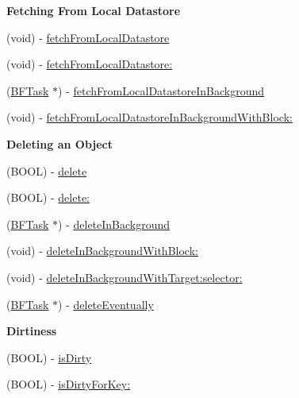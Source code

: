 \begin{Indent}{\bf Fetching From Local Datastore}\par
{\em 

 

 }\begin{DoxyCompactItemize}
\item 
(void) -\/ \hyperlink{interface_p_f_object_a93dbc7c60eb8bfcd239ad6b9c6df63ca}{fetch\+From\+Local\+Datastore}
\item 
(void) -\/ \hyperlink{interface_p_f_object_ae8707aa3350eaf3c39ab47ad1ec596ff}{fetch\+From\+Local\+Datastore\+:}
\item 
(\hyperlink{interface_b_f_task}{B\+F\+Task} $\ast$) -\/ \hyperlink{interface_p_f_object_a83205023ff184c314115a4c7cd500bfd}{fetch\+From\+Local\+Datastore\+In\+Background}
\item 
(void) -\/ \hyperlink{interface_p_f_object_af5cd865392d1feae3d079e8b0404d737}{fetch\+From\+Local\+Datastore\+In\+Background\+With\+Block\+:}
\end{DoxyCompactItemize}
\end{Indent}
\begin{Indent}{\bf Deleting an Object}\par
{\em 

 

 }\begin{DoxyCompactItemize}
\item 
(B\+O\+O\+L) -\/ \hyperlink{interface_p_f_object_ae661ddf471abc990874c0b1c36c6373c}{delete}
\item 
(B\+O\+O\+L) -\/ \hyperlink{interface_p_f_object_aff501c435717a04f800c5af5c49c9de0}{delete\+:}
\item 
(\hyperlink{interface_b_f_task}{B\+F\+Task} $\ast$) -\/ \hyperlink{interface_p_f_object_a6946805df2ac3480c17c2ad220b86422}{delete\+In\+Background}
\item 
(void) -\/ \hyperlink{interface_p_f_object_a09d09829b4832991d609ee2fe5f88fa1}{delete\+In\+Background\+With\+Block\+:}
\item 
(void) -\/ \hyperlink{interface_p_f_object_a8c8889b9f1a968ed70ecbf5e55356277}{delete\+In\+Background\+With\+Target\+:selector\+:}
\item 
(\hyperlink{interface_b_f_task}{B\+F\+Task} $\ast$) -\/ \hyperlink{interface_p_f_object_abfaafef6b0ea7901cfed5c8ccc89a514}{delete\+Eventually}
\end{DoxyCompactItemize}
\end{Indent}
\begin{Indent}{\bf Dirtiness}\par
{\em 

 

 }\begin{DoxyCompactItemize}
\item 
(B\+O\+O\+L) -\/ \hyperlink{interface_p_f_object_a51db61edb78c7e444fcf863a6e10b255}{is\+Dirty}
\item 
(B\+O\+O\+L) -\/ \hyperlink{interface_p_f_object_ad9c48cb7670b4f3bfeee7a249fe02c8a}{is\+Dirty\+For\+Key\+:}
\end{DoxyCompactItemize}
\end{Indent}
